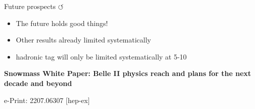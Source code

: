 \documentclass[xcolor=dvipsnames]{beamer}
\begin{document}
   \begin{frame}{Future prospects \hyperlink{frame:A}{$\circlearrowleft$}}
      \scriptsize\centering
         \begin{itemize}
            \item The future holds good things!
            \item Other results already limited systematically
            \item[\ra] hadronic tag will only be limited systematically at 5-10~\invab
         \end{itemize}
      
      
      
      \begin{flushright}
         \textbf{Snowmass White Paper: Belle II physics reach and plans for the next decade and beyond}
      
      e-Print: 2207.06307 [hep-ex]
      \end{flushright}
      \end{frame}
\end{document}
